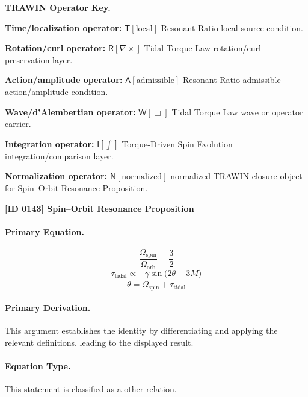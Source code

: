 \par\vspace{0.45\baselineskip}
\noindent\begin{minipage}[t]{\linewidth}
\begingroup
\small
\raggedright
\textbf{TRAWIN Operator Key.}\par
\noindent\textbf{Time/localization operator:} $\mathsf{T}\!\left[\mathrm{local}\right]$ Resonant Ratio local source condition.\par
\noindent\textbf{Rotation/curl operator:} $\mathsf{R}\!\left[\nabla\times\right]$ Tidal Torque Law rotation/curl preservation layer.\par
\noindent\textbf{Action/amplitude operator:} $\mathsf{A}\!\left[\mathrm{admissible}\right]$ Resonant Ratio admissible action/amplitude condition.\par
\noindent\textbf{Wave/d'Alembertian operator:} $\mathsf{W}\!\left[\Box\right]$ Tidal Torque Law wave or operator carrier.\par
\noindent\textbf{Integration operator:} $\mathsf{I}\!\left[\int\right]$ Torque-Driven Spin Evolution integration/comparison layer.\par
\noindent\textbf{Normalization operator:} $\mathsf{N}\!\left[\mathrm{normalized}\right]$ normalized TRAWIN closure object for Spin--Orbit Resonance Proposition.\par
\endgroup
\end{minipage}

\clearpage
\noindent\textbf{[ID 0143] Spin--Orbit Resonance Proposition}\par
\vspace{0.35em}
\paragraph{Primary Equation.}
\[
\frac{\Omega_{\mathrm{spin}}}{\Omega_{\mathrm{orb}}}=\frac{3}{2}
\]
\[
\tau_{\mathrm{tidal}}\propto -\gamma \sin\!\bigl(2\theta-3M\bigr)
\]
\[
\dot{\theta}=\Omega_{\mathrm{spin}}+\tau_{\mathrm{tidal}}
\]

\paragraph{Primary Derivation.}
This argument establishes the identity by differentiating and applying the relevant definitions. leading to the displayed result.
\paragraph{Equation Type.}
This statement is classified as a other relation.

